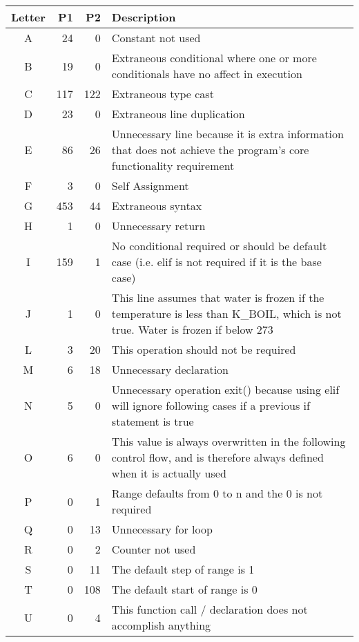 \vspace{5pt}
\begin{supertabular}{crrp{.6\textwidth}}
\label{labelsB}
Letter & P1 & P2 & Description \\ 
\toprule
A & 24 & 0 & Constant not used \\
B & 19 & 0 & Extraneous conditional where one or more conditionals have no affect in execution  \\
C & 117 & 122 & Extraneous type cast \\
D & 23 & 0 & Extraneous line duplication \\
E & 86 & 26 & Unnecessary line because it is extra information that does not achieve the program's core functionality requirement \\
F & 3 & 0 & Self Assignment \\
G & 453 & 44 & Extraneous syntax \\
H & 1 & 0 & Unnecessary return \\
I & 159 & 1 & No conditional required or should be default case (i.e. elif is not required if it is the base case)  \\
J & 1 & 0 & This line assumes that water is frozen if the temperature is less than K\_BOIL, which is not true. Water is frozen if below 273 \\
L & 3 & 20 & This operation should not be required \\
M & 6 & 18 & Unnecessary declaration  \\
N & 5 & 0 & Unnecessary operation exit() because using elif will ignore following cases if a previous if statement is true \\
O & 6 & 0 & This value is always overwritten in the following control flow, and is therefore always defined when it is actually used \\
P & 0 & 1 & Range defaults from 0 to n and the 0 is not required \\
Q & 0 & 13 & Unnecessary for loop \\
R & 0 & 2 & Counter not used \\
S & 0 & 11 & The default step of range is 1 \\
T & 0 & 108 & The default start of range is 0 \\
U & 0 & 4 & This function call / declaration does not accomplish anything \\

\end{supertabular}
\vspace{2em}
